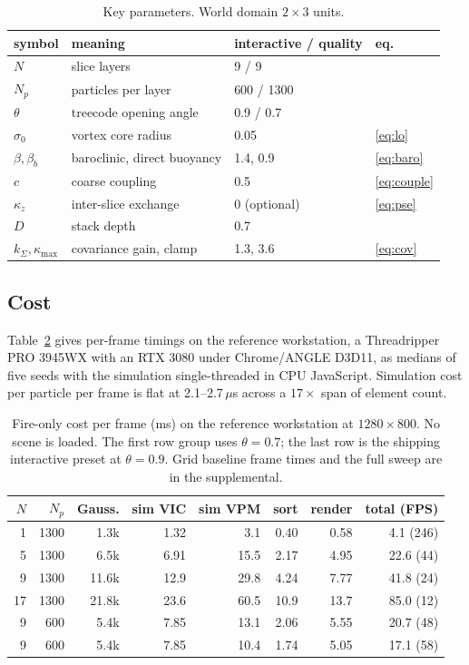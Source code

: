 \documentclass[acmtog,nonacm]{acmart}
\newcommand{\sigz}{\sigma_0}
\begin{document}
\begin{table}
\caption{Key parameters. World domain $2\times3$ units.}
\label{tab:params}
\footnotesize
\begin{tabular}{llll}
\toprule
symbol & meaning & interactive / quality & eq. \\
\midrule
$N$ & slice layers & 9 / 9 & \\
$N_p$ & particles per layer & 600 / 1300 & \\
$\theta$ & treecode opening angle & 0.9 / 0.7 & \\
$\sigz$ & vortex core radius & 0.05 & \ref{eq:lo} \\
$\beta,\beta_b$ & baroclinic, direct buoyancy & 1.4, 0.9 & \ref{eq:baro} \\
$c$ & coarse coupling & 0.5 & \ref{eq:couple} \\
$\kappa_z$ & inter-slice exchange & 0 (optional) & \ref{eq:pse} \\
$D$ & stack depth & 0.7 & \\
$k_\Sigma,\kappa_{\max}$ & covariance gain, clamp & 1.3, 3.6 & \ref{eq:cov} \\
\bottomrule
\end{tabular}
\end{table}

\subsection{Cost}
\label{sec:cost}
Table~\ref{tab:cost} gives per-frame timings on the reference workstation, a Threadripper PRO 3945WX with an RTX 3080 under Chrome/ANGLE D3D11, as medians of five seeds with the simulation single-threaded in CPU JavaScript. Simulation cost per particle per frame is flat at 2.1--2.7\,$\mu$s across a $17\times$ span of element count.

\begin{table}
\caption{Fire-only cost per frame (ms) on the reference workstation at $1280\times800$. No scene is loaded. The first row group uses $\theta=0.7$; the last row is the shipping interactive preset at $\theta=0.9$. Grid baseline frame times and the full sweep are in the supplemental.}
\label{tab:cost}
\footnotesize
\setlength{\tabcolsep}{4pt}
\begin{tabular}{rrrrrrrr}
\toprule
$N$ & $N_p$ & Gauss. & sim VIC & sim VPM & sort & render & total (FPS) \\
\midrule
1 & 1300 & 1.3k & 1.32 & 3.1 & 0.40 & 0.58 & 4.1 (246) \\
5 & 1300 & 6.5k & 6.91 & 15.5 & 2.17 & 4.95 & 22.6 (44) \\
9 & 1300 & 11.6k & 12.9 & 29.8 & 4.24 & 7.77 & 41.8 (24) \\
17 & 1300 & 21.8k & 23.6 & 60.5 & 10.9 & 13.7 & 85.0 (12) \\
9 & 600 & 5.4k & 7.85 & 13.1 & 2.06 & 5.55 & 20.7 (48) \\
\midrule
9 & 600 & 5.4k & 7.85 & 10.4 & 1.74 & 5.05 & 17.1 (58) \\
\bottomrule
\end{tabular}
\end{table}
\end{document}
